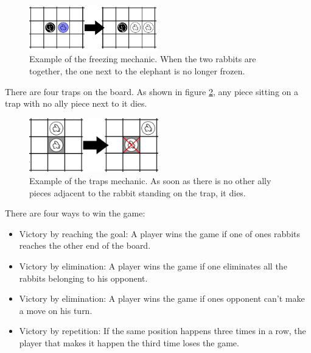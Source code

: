 \begin{figure}[!h]
\centering
\includegraphics[width=0.5\textwidth]{1_Presentation/1.1_Arimaa_rules_Gabriel/Pictures/Freeze.png}
\caption[Example of the freezing mechanic.]{Example of the freezing mechanic. When the two rabbits are together, the one next to the elephant is no longer frozen.}
\label{fig:freeze}
\end{figure}

There are four traps on the board. As shown in figure \ref{fig:trap}, any piece sitting on a trap with no ally piece next to it dies.

\begin{figure}[!h]
\centering
\includegraphics[width=0.5\textwidth]{1_Presentation/1.1_Arimaa_rules_Gabriel/Pictures/Trap.png}
\caption[Example of the traps mechanic.]{Example of the traps mechanic. As soon as there is no other ally pieces adjacent to the rabbit standing on the trap, it dies.}
\label{fig:trap}
\end{figure}

There are four ways to win the game:

\begin{itemize}
\item Victory by reaching the goal: A player wins the game if one of ones rabbits reaches the other end of the board.
\item Victory by elimination: A player wins the game if one eliminates all the rabbits belonging to his opponent.
\item Victory by elimination: A player wins the game if ones opponent can't make a move on his turn.
\item Victory by repetition: If the same position happens three times in a row, the player that makes it happen the third time loses the game.
\end{itemize}
